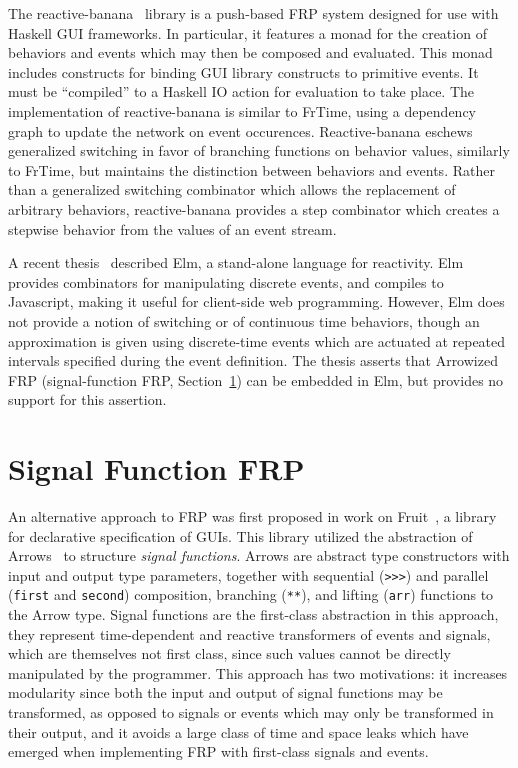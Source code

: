 The reactive-banana~\cite{Apfelmus} library is a push-based FRP system designed for use with Haskell GUI frameworks. In particular, it features a monad for
the creation of behaviors and events which may then be composed and evaluated. This monad includes constructs for binding GUI library constructs to primitive events.
It must be ``compiled'' to a Haskell IO action for evaluation to take place. The implementation of reactive-banana is similar to FrTime, using a dependency graph to update the network on event occurences. Reactive-banana eschews generalized switching in favor of branching functions on behavior values, similarly to FrTime, but
maintains the distinction between behaviors and events. Rather than a generalized switching combinator which allows the replacement of arbitrary behaviors,
reactive-banana provides a step combinator which creates a stepwise behavior from the values of an event stream.

A recent thesis~\cite{Czaplicki2012} described Elm, a stand-alone language for reactivity. Elm provides combinators for manipulating discrete events, and
compiles to Javascript, making it useful for client-side web programming. However, Elm does not provide a notion of switching or of continuous time behaviors,
though an approximation is given using discrete-time events which are actuated at repeated intervals specified during the event definition. The thesis asserts
that Arrowized FRP (signal-function FRP, Section~\ref{section:Background-signal_function_frp}) can be embedded in Elm, but provides no support for this assertion.

\section{Signal Function FRP}
\label{section:Background-signal_function_frp}

An alternative approach to FRP was first proposed in work on Fruit~\cite{Courtney2001-1}, a library for declarative specification of GUIs. This library
utilized the abstraction of Arrows~\cite{Hughes2000} to structure {\em signal functions}. Arrows are abstract type constructors with input and output type
parameters, together with sequential ({\tt >>>}) and parallel ({\tt first} and {\tt second}) composition, branching ({\tt ***}), and lifting ({\tt arr}) functions
to the Arrow type. Signal functions are the first-class abstraction in this approach, they represent time-dependent and reactive transformers of events and signals, 
which are themselves not first class, since such values cannot be directly manipulated by the programmer.
This approach has two motivations: it increases modularity since both the input and output of signal functions may be transformed,
as opposed to signals or events which may only be transformed in their output, and it avoids a large class of time and space leaks which have emerged when
implementing FRP with first-class signals and events.

